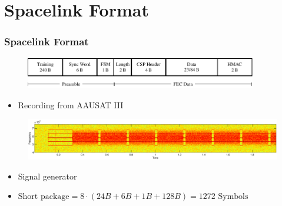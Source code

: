 \section{Spacelink Format}
\begin{frame} \frametitle{Spacelink Format}
    \begin{figure}[htbp]
        \centering
        \includegraphics[width=0.9\textwidth]{img/spacelink_format}
        \label{fig:spacelink_format}
    \end{figure}

\begin{itemize}
    \item Recording from AAUSAT III
\end{itemize}
    \begin{figure}[htbp]
        \centering
        \includegraphics[width=1\textwidth]{img/packet_from_recording}
        \label{fig:packet_from_recording} 
    \end{figure}

\begin{itemize}
    \item Signal generator
    \item  $\text{Short package} = 8 \cdot \left( 24B+6B+1B+128B \right) = 1272 \text{ Symbols}$
\end{itemize}
    
\end{frame}


